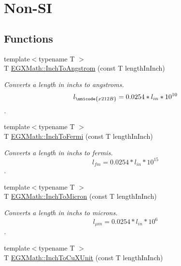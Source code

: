 \hypertarget{group___e_g_x_math-_conversions-_length_conversions-_imperial-_inch-_non-_s_i}{}\section{Non-\/\+SI}
\label{group___e_g_x_math-_conversions-_length_conversions-_imperial-_inch-_non-_s_i}
\subsection*{Functions}
\begin{DoxyCompactItemize}
\item 
{\footnotesize template$<$typename T $>$ }\\T \mbox{\hyperlink{group___e_g_x_math-_conversions-_length_conversions-_imperial-_inch-_non-_s_i_ga37c2030e31292fe77b024bffaf4c7f9b}{E\+G\+X\+Math\+::\+Inch\+To\+Angstrom}} (const T length\+In\+Inch)
\begin{DoxyCompactList}\small\item\em Converts a length in inchs to angstroms. \[ l_{\unicode{x212B}}=0.0254 * l_{in} * 10^{10} \]. \end{DoxyCompactList}\item 
{\footnotesize template$<$typename T $>$ }\\T \mbox{\hyperlink{group___e_g_x_math-_conversions-_length_conversions-_imperial-_inch-_non-_s_i_ga60087eace30a405617328d7c3ac3efb3}{E\+G\+X\+Math\+::\+Inch\+To\+Fermi}} (const T length\+In\+Inch)
\begin{DoxyCompactList}\small\item\em Converts a length in inchs to fermis. \[ l_{fm}=0.0254 * l_{in} * 10^{15} \]. \end{DoxyCompactList}\item 
{\footnotesize template$<$typename T $>$ }\\T \mbox{\hyperlink{group___e_g_x_math-_conversions-_length_conversions-_imperial-_inch-_non-_s_i_ga28d3076041cdf54ce5c25f834fb16128}{E\+G\+X\+Math\+::\+Inch\+To\+Micron}} (const T length\+In\+Inch)
\begin{DoxyCompactList}\small\item\em Converts a length in inchs to microns. \[ l_{\mu m}=0.0254 * l_{in} * 10^{6} \]. \end{DoxyCompactList}\item 
{\footnotesize template$<$typename T $>$ }\\T \mbox{\hyperlink{group___e_g_x_math-_conversions-_length_conversions-_imperial-_inch-_non-_s_i_ga90455aa8e1aaf26567c2b11fc24730c9}{E\+G\+X\+Math\+::\+Inch\+To\+Cu\+X\+Unit}} (const T length\+In\+Inch)

\end{DoxyCompactItemize}
